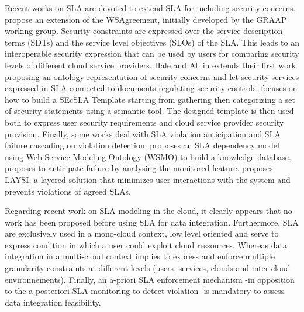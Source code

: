 
Recent  works on SLA are devoted to extend  SLA for including  security concerns. 
\cite{6274042} propose an extension of the WSAgreement, initially developed by the GRAAP
working group. 
Security constraints are expressed over the service description
terms (SDTs) and the service level objectives (SLOs) of the SLA. 
This leads to an interoperable security expression that can be used by users for comparing security levels of different cloud service providers. Hale and Al. in \cite{6655684} extends their first work proposing an ontology representation of security concerns and let security services expressed in SLA connected to documents regulating security controls.
\cite{LunaGarcia:2012:BCS:2381913.2381932} focuses on how to build a SEcSLA Template starting from gathering then categorizing a set of security statements using a semantic tool. 
The designed template is then used both to express user security requirements and cloud service provider security provision.
Finally, some works  deal with SLA violation anticipation and SLA failure cascading on violation detection.  \cite{Dastjerdi:2012:DOA:2275356.2275360}  proposes an SLA dependency model using Web Service Modeling Ontology (WSMO) to build a knowledge database. \cite{5614035} proposes to anticipate failure by analysing the monitored feature. 
\cite{5614035} proposes LAYSI, a layered solution that minimizes user interactions with the system and prevents violations of agreed SLAs.

Regarding recent work on SLA modeling in the cloud, it clearly appears that no work has been proposed before using SLA for data integration.
Furthermore, SLA are exclusively used in a mono-cloud context, low level oriented and serve to express condition in which a user could exploit cloud ressources. Whereas data integration in a multi-cloud context implies to express and enforce multiple granularity constraints at different levels (users, services, clouds and inter-cloud environnements).  Finally,  an a-priori SLA enforcement mechanism -in opposition to the a-posteriori SLA monitoring to detect violation-  is mandatory to assess data integration feasibility.

